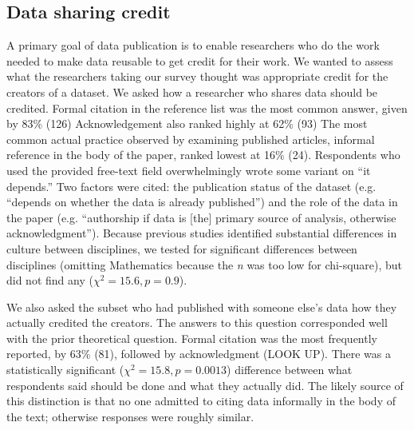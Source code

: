 \documentclass[10pt]{article}
\begin{document}
\subsection*{Data sharing credit}

A primary goal of data publication is to enable researchers who do the work needed to make data reusable to get credit for their work.
We wanted to assess what the researchers taking our survey thought was appropriate credit for the creators of a dataset.
We asked how a researcher who shares data should be credited.
Formal citation in the reference list was the most common answer, given by 83\% (126)
Acknowledgement also ranked highly at 62\% (93)
The most common actual practice observed by examining published articles, informal reference in the body of the paper\cite{sieber_not_1995, mooney_anatomy_2012}, ranked lowest at 16\% (24).
Respondents who used the provided free-text field overwhelmingly wrote some variant on ``it depends.''
Two factors were cited: the publication status of the dataset (e.g. ``depends on whether the data is already published'') and the role of the data in the paper (e.g. ``authorship if data is [the] primary source of analysis, otherwise acknowledgment'').
Because previous studies identified substantial differences in culture between disciplines\cite{harley_assessing_2010, swan_share_2008}, we tested for significant differences between disciplines (omitting Mathematics because the \emph{n} was too low for chi-square), but did not find any ($\chi^{2}= 15.6, p= 0.9$).

We also asked the subset who had published with someone else's data how they actually credited the creators.
The answers to this question corresponded well with the prior theoretical question.
Formal citation was the most frequently reported, by 63\% (81), followed by acknowledgment (LOOK UP).
There was a statistically significant ($\chi^{2}= 15.8, p= 0.0013$) difference between what respondents said should be done and what they actually did.
The likely source of this distinction is that no one admitted to citing data informally in the body of the text; otherwise responses were roughly similar.
\end{document}
